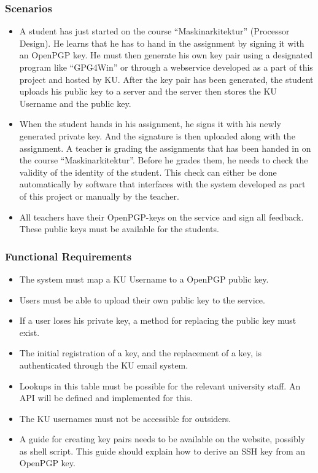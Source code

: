 \documentclass[11pt,a4paper]{article}
\begin{document}
\subsubsection{Scenarios}
\begin{itemize}
\item A student has just started on the course ``Maskinarkitektur'' (Processor Design). He learns that he has to hand in the assignment by signing it with an OpenPGP key. He must then generate his own key pair using a designated program like ``GPG4Win'' or through a webservice developed as a part of this project and hosted by KU. After the key pair has been generated, the student uploads his public key to a server and the server then stores the KU Username and the public key.
\item When the student hands in his assignment, he signs it with his newly generated private key. And the signature is then uploaded along with the assignment. A teacher is grading the assignments that has been handed in on the course ``Maskinarkitektur''. Before he grades them, he needs to check the validity of the identity of the student. This check can either be done automatically by software that interfaces with the system developed as part of this project or manually by the teacher.
\item All teachers have their OpenPGP-keys on the service and sign all feedback. These public keys must be available for the students.
\end{itemize}
\subsubsection{Functional Requirements}
\begin{itemize}
\item The system must map a KU Username to a OpenPGP public key.
\item Users must be able to upload their own public key to the service.
\item If a user loses his private key, a method for replacing the public key must exist.
\item The initial registration of a key, and the replacement of a key, is authenticated through the KU email system.
\item Lookups in this table must be possible for the relevant university staff. An API will be defined and implemented for this.
\item The KU usernames must not be accessible for outsiders.
\item A guide for creating key pairs needs to be available on the website, possibly as shell script. This guide should explain how to derive an SSH key from an OpenPGP key.
\end{itemize}
\end{document}

